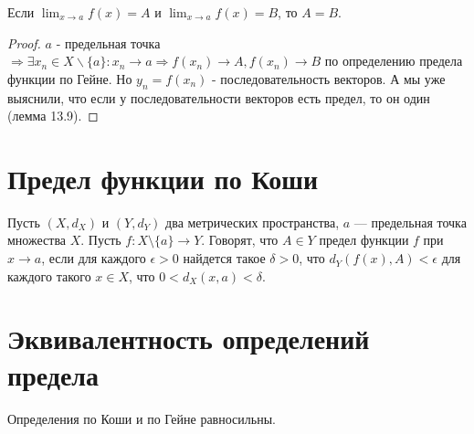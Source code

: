     \begin{sentence}
    	Если $\displaystyle \lim_{x \rightarrow a} f(x) = A$ и $\displaystyle \lim_{x \rightarrow a} f(x) = B$, то $A = B$.
    \end{sentence}
    
    \begin{proof}
    	$a$ - предельная точка $\Rightarrow \exists x_n \in X \backslash \{a\} : x_n \to a \Rightarrow f(x_n) \to A, f(x_n) \to B$ по определению предела функции по Гейне. Но $y_n = f(x_n)$ - последовательность векторов. А мы уже выяснили, что если у последовательности векторов есть предел, то он один (лемма 13.9).
    \end{proof}
    
    \section{Предел функции по Коши}
    
    \begin{definition}
    	Пусть $(X, d_X)$ и $(Y, d_Y)$ два метрических пространства, $a$ —
    	предельная точка множества $X$. Пусть $f : X \setminus \{a\} \rightarrow Y$. Говорят, что $A \in Y$ предел функции $f$ при $x \rightarrow a$, если для каждого $\epsilon > 0$ найдется такое $\delta > 0$, что $d_Y(f(x), A) < \epsilon$ для каждого такого $x \in X$, что $0 < d_X(x, a) < \delta$.
    \end{definition}
    
    \section{Эквивалентность определений предела}
    
    \begin{theorem}
    	Определения по Коши и по Гейне равносильны.
    \end{theorem}
    
